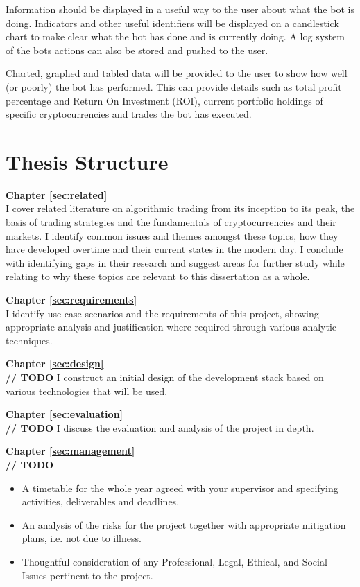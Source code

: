 Information should be displayed in a useful way to the user about what the bot is doing. Indicators and other useful identifiers will be displayed on a candlestick chart to make clear what the bot has done and is currently doing. A log system of the bots actions can also be stored and pushed to the user.

Charted, graphed and tabled data will be provided to the user to show how well (or poorly) the bot has performed. This can provide details such as total profit percentage and Return On Investment (ROI), current portfolio holdings of specific cryptocurrencies and trades the bot has executed.



\section{Thesis Structure}
\label{sec:intro:structure}

\textbf{Chapter \ref{sec:related}} \\[0.2em]
I cover related literature on algorithmic trading from its inception to its peak, the basis of trading strategies and the fundamentals of cryptocurrencies and their markets. I identify common issues and themes amongst these topics, how they have developed overtime and their current states in the modern day. I conclude with identifying gaps in their research and suggest areas for further study while relating to why these topics are relevant to this dissertation as a whole.

\textbf{Chapter \ref{sec:requirements}} \\[0.2em]
I identify use case scenarios and the requirements of this project, showing appropriate analysis and justification where required through various analytic techniques.

\textbf{Chapter \ref{sec:design}} \\[0.2em]
\textbf{// TODO}
I construct an initial design of the development stack based on various technologies that will be used.

\textbf{Chapter \ref{sec:evaluation}} \\[0.2em]
\textbf{// TODO}
I discuss the evaluation and analysis of the project in depth.

\textbf{Chapter \ref{sec:management}} \\[0.2em]
\textbf{// TODO}
\begin{itemize}
    \item A timetable for the whole year agreed with your supervisor and specifying activities, deliverables and deadlines.
    \item An analysis of the risks for the project together with appropriate mitigation plans, i.e. not due to illness.
    \item Thoughtful consideration of any Professional, Legal, Ethical, and Social Issues pertinent to the project.
\end{itemize}
